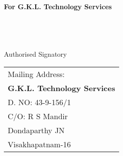 \documentclass[11pt]{article}
\begin{document}
{\bf For  G.K.L. Technology Services } \\ \\ \\ \\ \\
 \hspace*{0.6cm}Authorised Signatory
\vspace*{-72pt}
\begin{flushright}
\begin{tabular}{l}
Mailing Address:\\
{\bf G.K.L. Technology Services}\\
D. NO: 43-9-156/1\\
C/O: R S Mandir\\
Dondaparthy JN\\ 
Visakhapatnam-16\\
\end{tabular}
\end{flushright}
\end{document}
